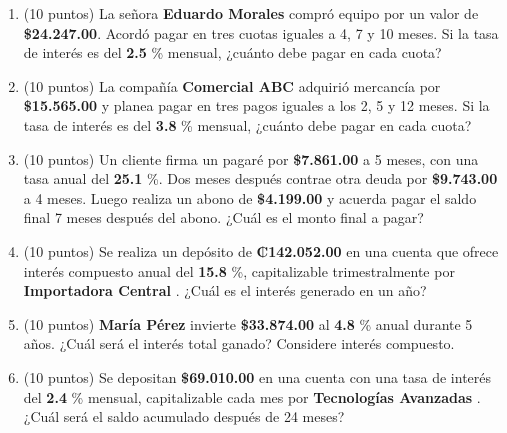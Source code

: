 \documentclass[10pt]{article}
\begin{document}
\begin{enumerate}[leftmargin=*, label=\textbf{\arabic*.}]
  \item (10 puntos) La señora \textbf{ Eduardo Morales } compró equipo por un valor de \textbf{\$\num{ 24,247.00 }}. Acordó pagar en tres cuotas iguales a 4, 7 y 10 meses. Si la tasa de interés es del \textbf{ 2.5 }\% mensual, ¿cuánto debe pagar en cada cuota?

  \vspace{0.5cm}

  \item (10 puntos) La compañía \textbf{ Comercial ABC } adquirió mercancía por \textbf{\$\num{ 15,565.00 }} y planea pagar en tres pagos iguales a los 2, 5 y 12 meses. Si la tasa de interés es del \textbf{ 3.8 }\% mensual, ¿cuánto debe pagar en cada cuota?

  \vspace{0.5cm}

  \item (10 puntos) Un cliente firma un pagaré por \textbf{\$\num{ 7,861.00 }} a 5 meses, con una tasa anual del \textbf{ 25.1 }\%. Dos meses después contrae otra deuda por \textbf{\$\num{ 9,743.00 }} a 4 meses. Luego realiza un abono de \textbf{\$\num{ 4,199.00 }} y acuerda pagar el saldo final 7 meses después del abono. ¿Cuál es el monto final a pagar?

  \vspace{0.5cm}

  \item (10 puntos) Se realiza un depósito de \textbf{₡\num{ 142.052.00 }} en una cuenta que ofrece interés compuesto anual del \textbf{ 15.8 }\%, capitalizable trimestralmente por \textbf{ Importadora Central }. ¿Cuál es el interés generado en un año?

  \vspace{0.5cm}

  \item (10 puntos) \textbf{ María Pérez } invierte \textbf{\$\num{ 33,874.00 }} al \textbf{ 4.8 }\% anual durante 5 años. ¿Cuál será el interés total ganado? Considere interés compuesto.

  \vspace{0.5cm}

  \item (10 puntos) Se depositan \textbf{\$\num{ 69,010.00 }} en una cuenta con una tasa de interés del \textbf{ 2.4 }\% mensual, capitalizable cada mes por \textbf{ Tecnologías Avanzadas }. ¿Cuál será el saldo acumulado después de 24 meses?
\end{enumerate}
\end{document}
